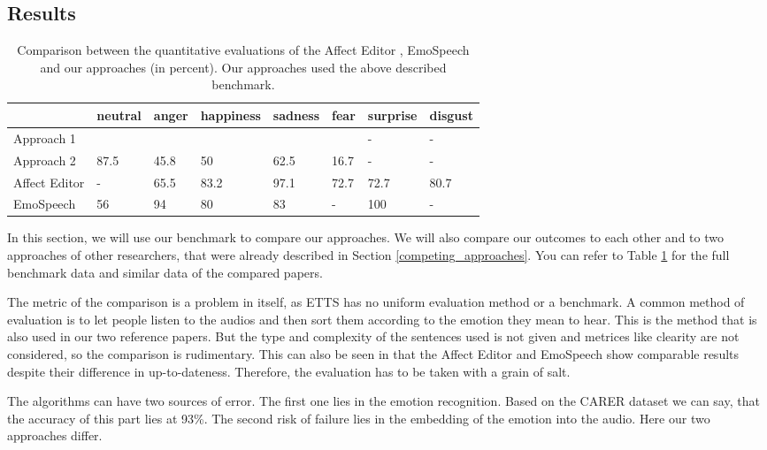 \documentclass[11pt]{article}
\begin{document}
\subsection{Results}
\begin{table}[t]

\centering
\vspace{5px}
{
\begin{tabular}{|p{2cm}|p{1.5cm}|p{1.5cm}|p{1.5cm}|p{1.5cm}|p{1.5cm}|p{1.5cm}|p{1.5cm}|}
\hline
\rowcolor{mintgreen}&neutral&anger&happiness&sadness&fear&surprise&disgust\\
\hline
\cellcolor{gainsboro}Approach 1&&&&&&-&-\\
\hline
\cellcolor{gainsboro}Approach 2&87.5&45.8&50&62.5&16.7&-&-\\
\hline
\hline
\cellcolor{gainsboro}Affect Editor& -&65.5&83.2&97.1&72.7&72.7&80.7\\
\hline
\cellcolor{gainsboro}EmoSpeech&56 &94&80 &83&-&100&-\\
\hline
\end{tabular}
}

\caption{Comparison between the quantitative evaluations of the Affect Editor \cite{cahn_generation_2000}, EmoSpeech \cite{diatlova_emospeech_2023} and our approaches (in percent). Our approaches used the above described benchmark.}
\label{Tabelle}
\end{table}
In this section, we will use our benchmark to compare our approaches. We will also compare our outcomes to each other and to two approaches of other researchers, that were already described in Section \ref{competing_approaches}. You can refer to Table \ref{Tabelle} for the full benchmark data and similar data of the compared papers.

The metric of the comparison is a problem in itself, as ETTS has no uniform evaluation method or a benchmark. A common method of evaluation is to let people listen to the audios and then sort them according to the emotion they mean to hear. This is the method that is also used in our two reference papers. But the type and complexity of the sentences used is not given and metrices like clearity are not considered, so the comparison is rudimentary. This can also be seen in that the Affect Editor \cite{cahn_generation_2000} and EmoSpeech \cite{diatlova_emospeech_2023} show comparable results despite their difference in up-to-dateness. Therefore, the evaluation has to be taken with a grain of salt.

The algorithms can have two sources of error. The first one lies in the emotion recognition. Based on the CARER dataset \cite{saravia-etal-2018-carer} we can say, that the accuracy of this part lies at 93\%. The second risk of failure lies in the embedding of the emotion into the audio. Here our two approaches differ.
\end{document}
